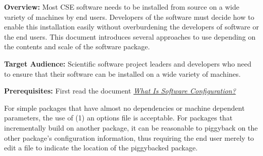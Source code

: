 \documentclass[]{article}
\date{}
\begin{document}
\pagestyle{fancy}
\renewcommand{\headrulewidth}{0pt}
  
\thispagestyle{empty}
\textbf{\newline}

\textbf{Overview:} Most CSE software needs to be installed from source
on a wide variety of machines by end users. Developers of the software
must decide how to enable this installation easily without overburdening
the developers of software or the end users. This document introduces
several approaches to use depending on the contents and scale of the
software package.

\textbf{Target Audience:} Scientific software project leaders and
developers who need to ensure that their software can be installed on a
wide variety of machines.

\textbf{Prerequisites:} First read the document
\href{http://ideas-productivity.org/wordpress/wp-content/uploads/2016/02/IDEAS-WhatIsSoftwareConfiguration-V0.1.pdf}{\emph{What
Is Software Configuration?}}

For simple packages that have almost no dependencies or machine
dependent parameters, the use of (1) an options file is acceptable. For
packages that incrementally build on another package, it can be
reasonable to piggyback on the other package's configuration
information, thus requiring the end user merely to edit a file to
indicate the location of the piggybacked package.
\end{document}
